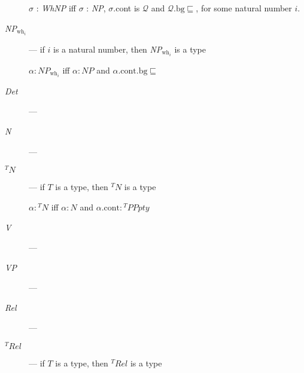 \begin{description}
  $\sigma$ : \textit{WhNP} iff $\sigma$ : \textit{NP}, $\sigma$.cont is $\mathcal{Q}$ and
$\mathcal{Q}.\text{bg}\sqsubseteq$, for some natural number
$i$.

\item[\textnormal{\textit{NP}$_{\text{wh}_i}$}] --- if $i$ is a
  natural number, then \textit{NP}$_{\text{wh}_i}$ is a type

  $\alpha:\textit{NP}_{\text{wh}_i}$ iff $\alpha:\textit{NP}$ and
  $\alpha.\text{cont}.\text{bg}\sqsubseteq$

  
\item[\textnormal{\textit{Det}}] --- 
  
\item[\textnormal{\textit{N}}] --- 
  
\item[\textnormal{$^T\textit{N}$}] --- if $T$ is a type, then
  $^T\textit{N}$ is a type

  $\alpha:{^T\textit{N}}$ iff
  $\alpha:\textit{N}$ and $\alpha.\text{cont}:{^T\textit{PPpty}}$
  
\item[\textnormal{\textit{V}}] --- 
  
  
\item[\textnormal{\textit{VP}}] --- 

\item[\textnormal{\textit{Rel}}] --- 

  
\item[\textnormal{$^T\textit{Rel}$}] --- if $T$ is a type, then
  $^T\textit{Rel}$ is a type


\end{description}
